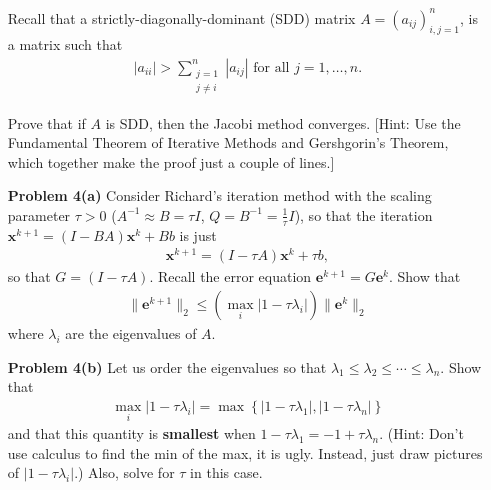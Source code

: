 \documentclass[12pt]{amsart}
\theoremstyle{plain}
\theoremstyle{definition}
\theoremstyle{remark}
\numberwithin{equation}{section} %
\numberwithin{figure}{section}   %
\newcommand{\vect}[1]{\mathbf{#1}}
\newcommand{\bx}{\vect{x}}
\newcommand{\be}{\vect{e}}
\newcommand{\set}[1]{\left\{#1\right\}}
\newcommand{\pnt}[1]{\left(#1\right)}
\begin{document}
\begin{itemize}
Recall that a strictly-diagonally-dominant (SDD) matrix $A=(a_{ij})_{i,j=1}^n$, is a matrix such that
 \begin{align*}
  |a_{ii}|> \sum_{\substack{j=1\\j\neq i}}^n|a_{ij}| \text{ for all }j=1,\ldots,n.
 \end{align*}

 Prove that if $A$ is SDD, then the Jacobi method converges.  [Hint: Use the Fundamental Theorem of Iterative Methods and Gershgorin's Theorem, which together make the proof just a couple of lines.]
 
\bigskip
 
\item[\bf Problem 4(a)] Consider Richard's iteration method with the scaling parameter $\tau>0$ ($A^{-1}\approx B=\tau I$, $Q=B^{-1}=\frac{1}{\tau}I$), so that the iteration $\bx^{k+1} = (I-BA)\bx^k+Bb$ is just
\begin{align*}
 \bx^{k+1} = (I-\tau A) \bx^k+\tau b,
\end{align*}
so that $G = (I-\tau A)$.  Recall the error equation $\be^{k+1} = G\be^k$.  Show that 
\begin{align*}
 \|\be^{k+1}\|_2\leq \pnt{\max_{i}|1-\tau\lambda_i|}\|\be^{k}\|_2
\end{align*}
where $\lambda_i$ are the eigenvalues of $A$.  

\bigskip

\item[\bf Problem 4(b)] Let us order the eigenvalues so that $\lambda_1\leq\lambda_2\leq\cdots\leq\lambda_n$.  Show that
\begin{align*}
 \max_{i}|1-\tau\lambda_i| = \max\set{|1-\tau\lambda_1|,|1-\tau\lambda_n|}
\end{align*}
and that this quantity is \textbf{smallest} when $1-\tau\lambda_1 = -1+\tau\lambda_n$.  (Hint: Don't use calculus to find the min of the max, it is ugly.  Instead, just draw pictures of $|1-\tau\lambda_i|$.) Also, solve for $\tau$ in this case.



\end{itemize}



 
 
 
\end{document}
